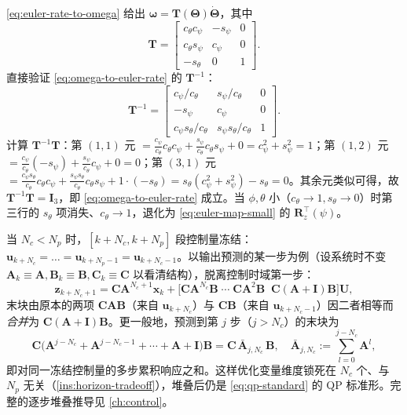 \begin{derivation}\label{deriv:euler-inverse}
\cref{eq:euler-rate-to-omega} 给出 $\boldsymbol{\omega}=\mathbf{T}(\boldsymbol{\Theta})\dot{\boldsymbol{\Theta}}$，其中
\[
  \mathbf{T}=\begin{bmatrix} c_\theta c_\psi & -s_\psi & 0 \\ c_\theta s_\psi & c_\psi & 0 \\ -s_\theta & 0 & 1 \end{bmatrix}.
\]
直接验证 \cref{eq:omega-to-euler-rate} 的 $\mathbf{T}^{-1}$：
\[
  \mathbf{T}^{-1}=\begin{bmatrix} c_\psi/c_\theta & s_\psi/c_\theta & 0 \\ -s_\psi & c_\psi & 0 \\ c_\psi s_\theta/c_\theta & s_\psi s_\theta/c_\theta & 1 \end{bmatrix}.
\]
计算 $\mathbf{T}^{-1}\mathbf{T}$：第 $(1,1)$ 元 $=\tfrac{c_\psi}{c_\theta}c_\theta c_\psi+\tfrac{s_\psi}{c_\theta}c_\theta s_\psi+0=c_\psi^2+s_\psi^2=1$；第 $(1,2)$ 元 $=\tfrac{c_\psi}{c_\theta}(-s_\psi)+\tfrac{s_\psi}{c_\theta}c_\psi+0=0$；第 $(3,1)$ 元 $=\tfrac{c_\psi s_\theta}{c_\theta}c_\theta c_\psi+\tfrac{s_\psi s_\theta}{c_\theta}c_\theta s_\psi+1\cdot(-s_\theta)=s_\theta(c_\psi^2+s_\psi^2)-s_\theta=0$。其余元类似可得，故 $\mathbf{T}^{-1}\mathbf{T}=\mathbf{I}_3$，即 \cref{eq:omega-to-euler-rate} 成立。当 $\phi,\theta$ 小（$c_\theta\to1,s_\theta\to0$）时第三行的 $s_\theta$ 项消失、$c_\theta\to1$，退化为 \cref{eq:euler-map-small} 的 $\mathbf{R}_z^\top(\psi)$。
\end{derivation}

\begin{derivation}\label{deriv:freeze}
当 $N_c<N_p$ 时，$[k{+}N_c,k{+}N_p]$ 段控制量冻结：$\boldsymbol{u}_{k+N_c}=\dots=\boldsymbol{u}_{k+N_p-1}=\boldsymbol{u}_{k+N_c-1}$。以输出预测的某一步为例（设系统时不变 $\mathbf{A}_k\equiv\mathbf{A},\mathbf{B}_k\equiv\mathbf{B},\mathbf{C}_k\equiv\mathbf{C}$ 以看清结构），脱离控制时域第一步：
\[
  \boldsymbol{z}_{k+N_c+1}=\mathbf{C}\mathbf{A}^{N_c+1}\boldsymbol{x}_k+\big[\mathbf{C}\mathbf{A}^{N_c}\mathbf{B}\;\cdots\;\mathbf{C}\mathbf{A}^2\mathbf{B}\;\;\mathbf{C}(\mathbf{A}+\mathbf{I})\mathbf{B}\big]\mathbf{U},
\]
末块由原本的两项 $\mathbf{C}\mathbf{A}\mathbf{B}$（来自 $\boldsymbol{u}_{k+N_c}$）与 $\mathbf{C}\mathbf{B}$（来自 $\boldsymbol{u}_{k+N_c-1}$）因二者相等而\emph{合并}为 $\mathbf{C}(\mathbf{A}+\mathbf{I})\mathbf{B}$。更一般地，预测到第 $j$ 步（$j>N_c$）的末块为
\[
  \mathbf{C}\big(\mathbf{A}^{j-N_c}+\mathbf{A}^{j-N_c-1}+\cdots+\mathbf{A}+\mathbf{I}\big)\mathbf{B}=\mathbf{C}\,\bar{\mathbf{A}}_{j,N_c}\,\mathbf{B},\quad\bar{\mathbf{A}}_{j,N_c}:=\sum_{l=0}^{j-N_c}\mathbf{A}^l,
\]
即对同一冻结控制量的多步累积响应之和。这样优化变量维度锁死在 $N_c$ 个、与 $N_p$ 无关（\cref{ins:horizon-tradeoff}），堆叠后仍是 \cref{eq:qp-standard} 的 QP 标准形。完整的逐步堆叠推导见 \cref{ch:control}。
\end{derivation}

